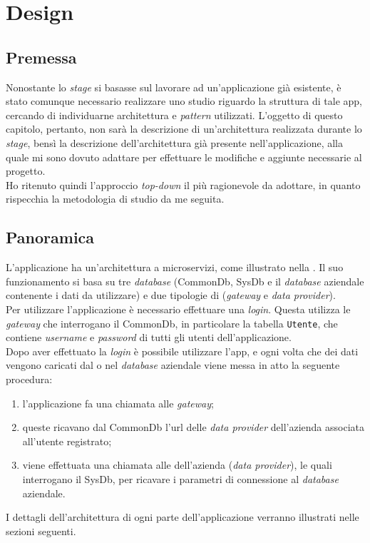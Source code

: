 \chapter{Design}
\label{cap:design}


\section{Premessa}

Nonostante lo \textit{stage} si basasse sul lavorare ad un'applicazione già esistente, è stato comunque necessario realizzare uno studio riguardo la struttura di tale app, cercando di individuarne architettura e \textit{pattern} utilizzati. L'oggetto di questo capitolo, pertanto, non sarà la descrizione di un'architettura realizzata durante lo \textit{stage}, bensì la descrizione dell'architettura già presente nell'applicazione, alla quale mi sono dovuto adattare per effettuare le modifiche e aggiunte necessarie al progetto.\\
Ho ritenuto quindi l'approccio \textit{top-down} il più ragionevole da adottare, in quanto rispecchia la metodologia di studio da me seguita.

\section{Panoramica}

L'applicazione ha un'architettura a microservizi, come illustrato nella . Il suo funzionamento si basa su tre \textit{database} (CommonDb, SysDb e il \textit{database} aziendale contenente i dati da utilizzare) e due tipologie di  (\textit{gateway} e \textit{data provider}).\\
Per utilizzare l'applicazione è necessario effettuare una \textit{login}. Questa utilizza le  \textit{gateway} che interrogano il CommonDb, in particolare la tabella \texttt{Utente}, che contiene \textit{username} e \textit{password} di tutti gli utenti dell'applicazione.\\
Dopo aver effettuato la \textit{login} è possibile utilizzare l'app, e ogni volta che dei dati vengono caricati dal o nel \textit{database} aziendale viene messa in atto la seguente procedura:
\begin{enumerate}
    \item l'applicazione fa una chiamata alle  \textit{gateway};
    \item queste ricavano dal CommonDb l'url delle  \textit{data provider} dell'azienda associata all'utente registrato;
    \item viene effettuata una chiamata alle  dell'azienda (\textit{data provider}), le quali interrogano il SysDb, per ricavare i parametri di connessione al \textit{database} aziendale.
\end{enumerate}
I dettagli dell'architettura di ogni parte dell'applicazione verranno illustrati nelle sezioni seguenti.

